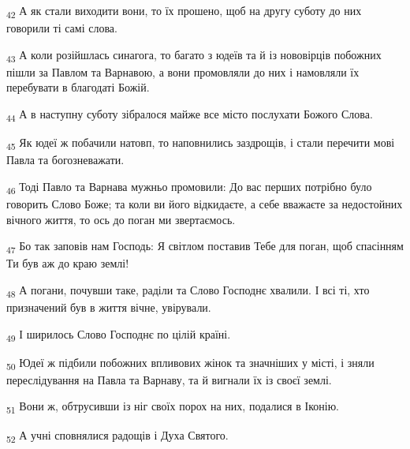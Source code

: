 \begin{tcolorbox}
\textsubscript{42} А як стали виходити вони, то їх прошено, щоб на другу суботу до них говорили ті самі слова.
\end{tcolorbox}
\begin{tcolorbox}
\textsubscript{43} А коли розійшлась синагога, то багато з юдеїв та й із нововірців побожних пішли за Павлом та Варнавою, а вони промовляли до них і намовляли їх перебувати в благодаті Божій.
\end{tcolorbox}
\begin{tcolorbox}
\textsubscript{44} А в наступну суботу зібралося майже все місто послухати Божого Слова.
\end{tcolorbox}
\begin{tcolorbox}
\textsubscript{45} Як юдеї ж побачили натовп, то наповнились заздрощів, і стали перечити мові Павла та богозневажати.
\end{tcolorbox}
\begin{tcolorbox}
\textsubscript{46} Тоді Павло та Варнава мужньо промовили: До вас перших потрібно було говорить Слово Боже; та коли ви його відкидаєте, а себе вважаєте за недостойних вічного життя, то ось до поган ми звертаємось.
\end{tcolorbox}
\begin{tcolorbox}
\textsubscript{47} Бо так заповів нам Господь: Я світлом поставив Тебе для поган, щоб спасінням Ти був аж до краю землі!
\end{tcolorbox}
\begin{tcolorbox}
\textsubscript{48} А погани, почувши таке, раділи та Слово Господнє хвалили. І всі ті, хто призначений був в життя вічне, увірували.
\end{tcolorbox}
\begin{tcolorbox}
\textsubscript{49} І ширилось Слово Господнє по цілій країні.
\end{tcolorbox}
\begin{tcolorbox}
\textsubscript{50} Юдеї ж підбили побожних впливових жінок та значніших у місті, і зняли переслідування на Павла та Варнаву, та й вигнали їх із своєї землі.
\end{tcolorbox}
\begin{tcolorbox}
\textsubscript{51} Вони ж, обтрусивши із ніг своїх порох на них, подалися в Іконію.
\end{tcolorbox}
\begin{tcolorbox}
\textsubscript{52} А учні сповнялися радощів і Духа Святого.
\end{tcolorbox}
